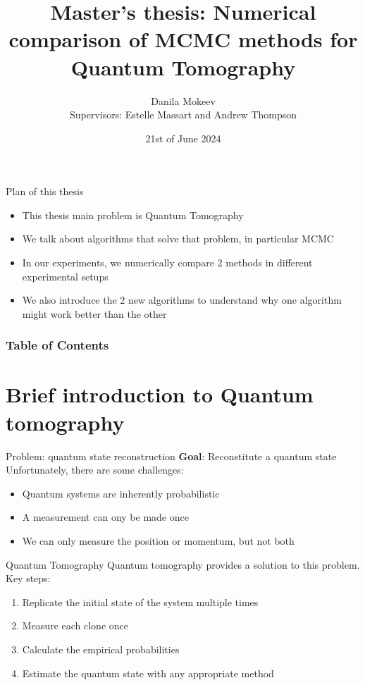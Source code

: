 \documentclass{beamer}
\title{Master's thesis: Numerical comparison of MCMC methods for Quantum Tomography}
\author[Mokeev]
{ Danila Mokeev\\{\small Supervisors: Estelle Massart and Andrew Thompson}}
\institute[EPL]{Ecole Polytechnique de Louvain}
\date{21st of June 2024}
\newcommand{\tb}{\textbf}
\begin{document}
\frame{\titlepage}

\begin{frame}{Plan of this thesis}
    \begin{itemize}
        \item This thesis main problem is Quantum Tomography
        \item We talk about algorithms that solve that problem, in particular MCMC
        \item In our experiments, we numerically compare 2 methods in different experimental setups
        \item We also introduce the 2 new algorithms to understand why one algorithm might work better than the other 
    \end{itemize}
\end{frame}


\begin{frame}
\frametitle{Table of Contents}
\tableofcontents
\end{frame}

\section{Brief introduction to Quantum tomography}
\begin{frame}{Problem: quantum state reconstruction}
    \tb{Goal}: Reconstitute a quantum state\medbreak
    Unfortunately, there are some challenges: 
    \begin{itemize}
        \item Quantum systems are inherently probabilistic
        \item A measurement can ony be made once
        \item We can only measure the position or momentum, but not both
    \end{itemize}
\end{frame}
\begin{frame}{Quantum Tomography}
    Quantum tomography provides a solution to this problem.\medbreak
    Key steps:
    \begin{enumerate}
        \item Replicate the initial state of the system multiple times
        \item Measure each clone once
        \item Calculate the empirical probabilities
        \item Estimate the quantum state with any appropriate method
    \end{enumerate}

\end{frame}
\end{document}
